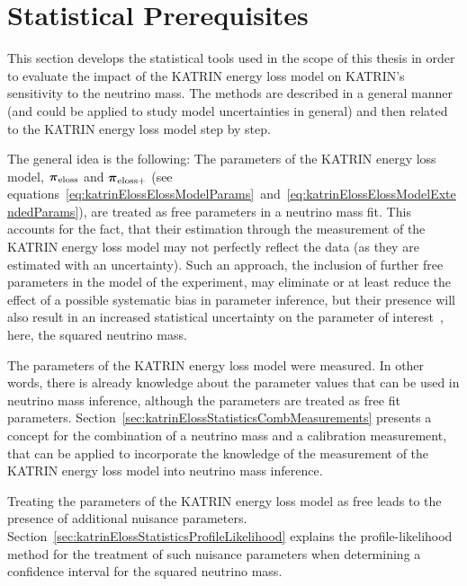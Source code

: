 \def\currentRootFolder{chapter/sensitivityStudyWithPreliminaryKatrinElossModel/statisticalPrerequisites}
\def\currentFigureFolder{\currentRootFolder/fig}



\section{Statistical Prerequisites}
\label{sec:katrinElossStatistics}
This section develops the statistical tools used in the scope of this thesis in order to evaluate the impact of the KATRIN energy loss model on KATRIN's sensitivity to the neutrino mass. The methods are described in a general manner (and could be applied to study model uncertainties in general) and then related to the KATRIN energy loss model step by step.

The general idea is the following: The parameters of the KATRIN energy loss model, $\boldsymbol{\mathbf{\pi}}_\mathrm{eloss}$ and $\boldsymbol{\mathbf{\pi}}_\mathrm{eloss+}$ (see equations~\ref{eq:katrinElossElossModelParams}~and~\ref{eq:katrinElossElossModelExtendedParams}), are treated as free parameters in a neutrino mass fit. This accounts for the fact, that their estimation through the measurement of the KATRIN energy loss model may not perfectly reflect the data (as they are estimated with an uncertainty). Such an approach, the inclusion of further free parameters in the model of the experiment, may eliminate or at least reduce the effect of a possible systematic bias in parameter inference, but their presence will also result in an increased statistical uncertainty on the parameter of interest~\cite{ReviewOfParticlePhysics}, here, the squared neutrino mass.

The parameters of the KATRIN energy loss model were measured. In other words, there is already knowledge about the parameter values that can be used in neutrino mass inference, although the parameters are treated as free fit parameters. Section~\ref{sec:katrinElossStatisticsCombMeasurements} presents a concept for the combination of a neutrino mass and a calibration measurement, that can be applied to incorporate the knowledge of the measurement of the KATRIN energy loss model into neutrino mass inference.

Treating the parameters of the KATRIN energy loss model as free leads to the presence of additional nuisance parameters. Section~\ref{sec:katrinElossStatisticsProfileLikelihood} explains the profile-likelihood method for the treatment of such nuisance parameters when determining a confidence interval for the squared neutrino mass. 

